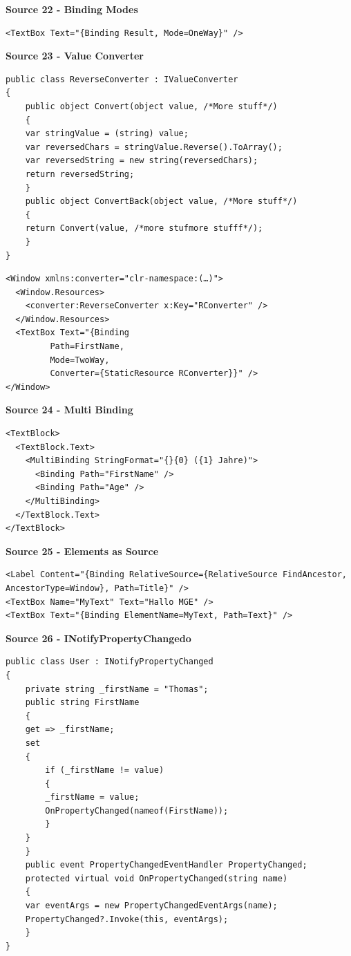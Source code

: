 \documentclass[10pt,twoside,landscape]{article}
\begin{document}
\begin{multicols}{2}
\textbf{Source 22 - Binding Modes}
\lstset{language=XML,label= ,caption= ,captionpos=b,numbers=none}
\begin{lstlisting}
<TextBox Text="{Binding Result, Mode=OneWay}" />
\end{lstlisting}

\textbf{Source 23 - Value Converter}
\lstset{language=csharp,label= ,caption= ,captionpos=b,numbers=none}
\begin{lstlisting}
public class ReverseConverter : IValueConverter
{
    public object Convert(object value, /*More stuff*/)
    {
	var stringValue = (string) value;
	var reversedChars = stringValue.Reverse().ToArray();
	var reversedString = new string(reversedChars);
	return reversedString;
    }
    public object ConvertBack(object value, /*More stuff*/)
    {
	return Convert(value, /*more stufmore stufff*/);
    }
}
\end{lstlisting}

\lstset{language=XML,label= ,caption= ,captionpos=b,numbers=none}
\begin{lstlisting}
<Window xmlns:converter="clr-namespace:(…)">
  <Window.Resources>
    <converter:ReverseConverter x:Key="RConverter" />
  </Window.Resources>
  <TextBox Text="{Binding
		 Path=FirstName,
		 Mode=TwoWay,
		 Converter={StaticResource RConverter}}" />
</Window>
\end{lstlisting}

\textbf{Source 24 - Multi Binding}
\lstset{language=XML,label= ,caption= ,captionpos=b,numbers=none}
\begin{lstlisting}
<TextBlock>
  <TextBlock.Text>
    <MultiBinding StringFormat="{}{0} ({1} Jahre)">
      <Binding Path="FirstName" />
      <Binding Path="Age" />
    </MultiBinding>
  </TextBlock.Text>
</TextBlock>
\end{lstlisting}

\textbf{Source 25 - Elements as Source}
\lstset{language=XML,label= ,caption= ,captionpos=b,numbers=none}
\begin{lstlisting}
<Label Content="{Binding RelativeSource={RelativeSource FindAncestor, AncestorType=Window}, Path=Title}" />
<TextBox Name="MyText" Text="Hallo MGE" />
<TextBox Text="{Binding ElementName=MyText, Path=Text}" />
\end{lstlisting}

\textbf{Source 26 - INotifyPropertyChangedo}
\lstset{language=csharp,label= ,caption= ,captionpos=b,numbers=none}
\begin{lstlisting}
public class User : INotifyPropertyChanged
{
    private string _firstName = "Thomas";
    public string FirstName
    {
	get => _firstName;
	set
	{
	    if (_firstName != value)
	    {
		_firstName = value;
		OnPropertyChanged(nameof(FirstName));
	    }
	}
    }
    public event PropertyChangedEventHandler PropertyChanged;
    protected virtual void OnPropertyChanged(string name)
    {
	var eventArgs = new PropertyChangedEventArgs(name);
	PropertyChanged?.Invoke(this, eventArgs);
    }
}
\end{lstlisting}


\end{multicols}
\end{document}
